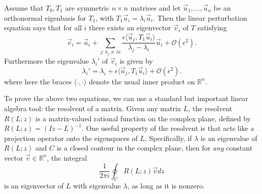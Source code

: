 \documentclass[10pt,journal,compsoc]{IEEEtran} %
\theoremstyle{definition}
\newcommand{\bbr}{\mathbb R}
\newcommand{\sheaf}[1]{\mathcal{#1}}
\begin{document}
Assume that $T_0,T_1$ are symmetric $n\times n$ matrices and let $\vec
u_1,\dots, \vec u_n$ be an orthonormal eigenbasis for $T_1$, with
$T_1\vec u_i = \lambda_i \vec u_i$.  Then the linear perturbation
equation says that for all $i$ there exists an eigenvector $\vec v_i$
of $T$ satisfying
\begin{equation}\label{linear eigenvector perturbation} \vec v_i =
\vec u_i + \sum_{j:\lambda_j\neq\lambda i}\frac{\epsilon\langle \vec
u_j,T_1\vec u_i\rangle}{\lambda_j-\lambda_i}\vec u_i + \sheaf
O(\epsilon^2).
\end{equation} Furthermore the eigenvalue $\lambda_i'$ of $\vec v_i$
is given by
\begin{equation}\label{linear eigenvalue perturbation} \lambda_i' =
\lambda_i + \epsilon\langle \vec u_j,T_1\vec u_i\rangle + \sheaf
O(\epsilon^2).
\end{equation} where here the braces $\langle\cdot,\cdot\rangle$
denote the usual inner product on $\bbr^n$.

To prove the above two equations, we can use a standard but important
linear algebra tool: the resolvent of a matrix.  Given any matrix $L$,
the resolvent $R(L;z)$ is a matrix-valued rational function on the
complex plane, defined by $R(L;z) = (Iz-L)^{-1}$.  One useful property
of the resolvent is that acts like a projection operator onto the
eigenspaces of $L$.  Specifically, if $\lambda$ is an eigenvalue of
$R(L;z)$ and $C$ is a closed contour in the complex plane, then for
\emph{any} constant vector $\vec v\in\bbr^n$, the integral
$$\frac{1}{2\pi i}\oint_C R(L;z)\vec v dz$$
is an eigenvector of $L$ with eigenvalue $\lambda$, as long as it is
nonzero.
\end{document}
